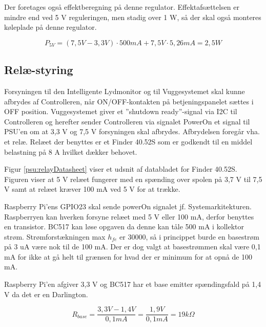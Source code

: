
Der foretages også effektberegning på denne regulator. Effektafsættelsen er mindre end ved 5 V reguleringen, men stadig over 1 W, så der skal også monteres køleplade på denne regulator.

\begin{equation} 
{ P }_{ 5V }=(7,5V-3,3V)\cdot 500mA+7,5V\cdot 5,26mA=2,5W
\label{eq:P3.3V}
\end{equation}

\subsection*{Relæ-styring}

Forsyningen til den Intelligente Lydmonitor og til Vuggesystemet skal kunne afbrydes af Controlleren, når ON/OFF-kontakten på betjeningspanelet sættes i OFF position. Vuggesystemet giver et ''shutdown ready''-signal via I2C til Controlleren og herefter sender Controlleren via signalet PowerOn et signal til PSU'en om at 3,3 V og 7,5 V forsyningen skal afbrydes. Afbrydelsen foregår vha. et relæ. Relæet der benyttes er et Finder 40.52S som er godkendt til en middel belastning på 8 A hvilket dækker behovet. 


Figur \ref{psu:relayDatasheet} viser et udsnit af databladet for Finder 40.52S. Figuren viser at 5 V relæet fungerer med en spænding over spolen på 3,7 V til 7,5 V samt at relæet kræver 100 mA ved 5 V for at trække.

Raspberry Pi'ens GPIO23 skal sende powerOn signalet jf. Systemarkitekturen. Raspberryen kan hverken forsyne relæet med 5 V eller 100 mA, derfor benyttes en transistor. BC517 kan løse opgaven da denne kan tåle 500 mA i kollektor strøm. Strømforstækningen max $h_{fe}$ er 30000, så i princippet burde en basestrøm på 3 uA være nok til de 100 mA. Der er dog valgt at basestrømmen skal være 0,1 mA for ikke at gå helt til grænsen for hvad der er minimum for at opnå de 100 mA. 

Raspberry Pi'en afgiver 3,3 V og BC517 har et base emitter spændingsfald på 1,4 V da det er en Darlington. 

\begin{equation}
{ R }_{ base }=\frac { 3,3V-1,4V }{ 0,1mA } =\frac { 1,9V }{ 0,1mA } =19k\Omega
\label{eq:R_base}
\end{equation}

